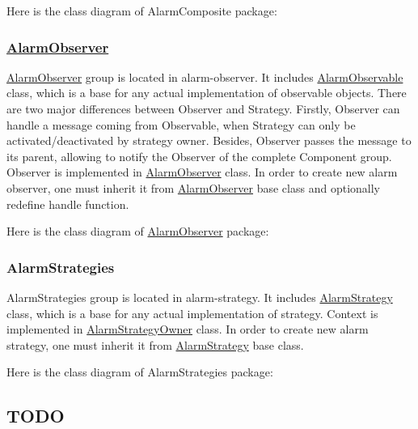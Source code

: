Here is the class diagram of Alarm\+Composite package\+:



\subsubsection*{\hyperlink{classAlarmObserver}{Alarm\+Observer}}

\hyperlink{classAlarmObserver}{Alarm\+Observer} group is located in {\ttfamily alarm-\/observer}. It includes {\ttfamily \hyperlink{classAlarmObservable}{Alarm\+Observable}} class, which is a base for any actual implementation of observable objects. There are two major differences between Observer and Strategy. Firstly, Observer can handle a message coming from Observable, when Strategy can only be activated/deactivated by strategy owner. Besides, Observer passes the message to its parent, allowing to notify the Observer of the complete Component group. Observer is implemented in {\ttfamily \hyperlink{classAlarmObserver}{Alarm\+Observer}} class. In order to create new alarm observer, one must inherit it from {\ttfamily \hyperlink{classAlarmObserver}{Alarm\+Observer}} base class and optionally redefine {\ttfamily handle} function.

Here is the class diagram of \hyperlink{classAlarmObserver}{Alarm\+Observer} package\+:



\subsubsection*{Alarm\+Strategies}

Alarm\+Strategies group is located in {\ttfamily alarm-\/strategy}. It includes {\ttfamily \hyperlink{classAlarmStrategy}{Alarm\+Strategy}} class, which is a base for any actual implementation of strategy. Context is implemented in {\ttfamily \hyperlink{classAlarmStrategyOwner}{Alarm\+Strategy\+Owner}} class. In order to create new alarm strategy, one must inherit it from {\ttfamily \hyperlink{classAlarmStrategy}{Alarm\+Strategy}} base class.

Here is the class diagram of Alarm\+Strategies package\+:



\subsection*{T\+O\+DO}


